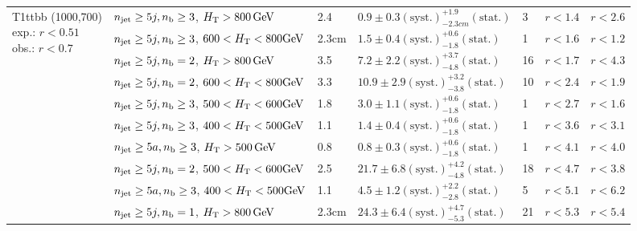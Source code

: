 \begin{table}[h!]
\begin{tabular}{ lllllll }
\multirow{10}{*}{\parbox[t]{2.3cm}{T1ttbb (1000,700)\\exp.: $r<0.51$\\obs.: $r<0.7$}}
 & $n_{\mathrm{jet}} \geq5j,n_{\text{b}} \geq3$, $\mbox{$H_\text{T}$} > 800 \, \mathrm{GeV}$ & 2.4 & $0.9 \pm 0.3 \mathrm{(syst.)} ^{+1.9}_{-2.3cm} \mathrm{(stat.)}$ & 3 & $r < 1.4$ & $r < 2.6$\\ 
 & $n_{\mathrm{jet}} \geq5j,n_{\text{b}} \geq3$, $600 < \mbox{$H_\text{T}$} < 800 \mathrm{GeV}$ & 2.3cm & $1.5 \pm 0.4 \mathrm{(syst.)} ^{+0.6}_{-1.8} \mathrm{(stat.)}$ & 1 & $r < 1.6$ & $r < 1.2$\\ 
 & $n_{\mathrm{jet}} \geq5j,n_{\text{b}} =2$, $\mbox{$H_\text{T}$} > 800 \, \mathrm{GeV}$ & 3.5 & $7.2 \pm 2.2 \mathrm{(syst.)} ^{+3.7}_{-4.8} \mathrm{(stat.)}$ & 16 & $r < 1.7$ & $r < 4.3$\\ 
 & $n_{\mathrm{jet}} \geq5j,n_{\text{b}} =2$, $600 < \mbox{$H_\text{T}$} < 800 \mathrm{GeV}$ & 3.3 & $10.9 \pm 2.9 \mathrm{(syst.)} ^{+3.2}_{-3.8} \mathrm{(stat.)}$ & 10 & $r < 2.4$ & $r < 1.9$\\ 
 & $n_{\mathrm{jet}} \geq5j,n_{\text{b}} \geq3$, $500 < \mbox{$H_\text{T}$} < 600 \mathrm{GeV}$ & 1.8 & $3.0 \pm 1.1 \mathrm{(syst.)} ^{+0.6}_{-1.8} \mathrm{(stat.)}$ & 1 & $r < 2.7$ & $r < 1.6$\\ 
 & $n_{\mathrm{jet}} \geq5j,n_{\text{b}} \geq3$, $400 < \mbox{$H_\text{T}$} < 500 \mathrm{GeV}$ & 1.1 & $1.4 \pm 0.4 \mathrm{(syst.)} ^{+0.6}_{-1.8} \mathrm{(stat.)}$ & 1 & $r < 3.6$ & $r < 3.1$\\ 
 & $n_{\mathrm{jet}} \geq5a,n_{\text{b}} \geq3$, $\mbox{$H_\text{T}$} > 500 \, \mathrm{GeV}$ & 0.8 & $0.8 \pm 0.3 \mathrm{(syst.)} ^{+0.6}_{-1.8} \mathrm{(stat.)}$ & 1 & $r < 4.1$ & $r < 4.0$\\ 
 & $n_{\mathrm{jet}} \geq5j,n_{\text{b}} =2$, $500 < \mbox{$H_\text{T}$} < 600 \mathrm{GeV}$ & 2.5 & $21.7 \pm 6.8 \mathrm{(syst.)} ^{+4.2}_{-4.8} \mathrm{(stat.)}$ & 18 & $r < 4.7$ & $r < 3.8$\\ 
 & $n_{\mathrm{jet}} \geq5a,n_{\text{b}} \geq3$, $400 < \mbox{$H_\text{T}$} < 500 \mathrm{GeV}$ & 1.1 & $4.5 \pm 1.2 \mathrm{(syst.)} ^{+2.2}_{-2.8} \mathrm{(stat.)}$ & 5 & $r < 5.1$ & $r < 6.2$\\ 
 & $n_{\mathrm{jet}} \geq5j,n_{\text{b}} =1$, $\mbox{$H_\text{T}$} > 800 \, \mathrm{GeV}$ & 2.3cm & $24.3 \pm 6.4 \mathrm{(syst.)} ^{+4.7}_{-5.3} \mathrm{(stat.)}$ & 21 & $r < 5.3$ & $r < 5.4$\\ \hline
    \hline
  \end{tabular}
\end{table}


